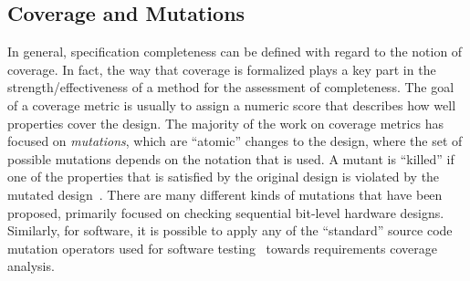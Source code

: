 \subsection{Coverage and Mutations}
\label{subsec:nondet}
In general, specification completeness can be defined with
regard to the notion of coverage. In fact, the way that coverage
is formalized plays a key part in the strength/effectiveness of
a method for the assessment of completeness. The goal of a coverage metric is usually to assign a numeric score that describes how well properties cover the design. The majority of the work on coverage metrics has focused on {\em mutations}, which are ``atomic'' changes to the design, where the set of possible mutations depends on the notation that is used.  A mutant is ``killed'' if one of the properties that is satisfied by the original design is violated by the mutated design~\cite{chockler_coverage_2003,chockler2001practical,chockler2010coverage,Kupferman:2006:SCF,kupferman_theory_2008}.  There are many different kinds of mutations that have been proposed, primarily focused on checking sequential bit-level hardware designs.  
Similarly, for software, it is possible to apply any of the ``standard'' source code mutation operators used for software testing~\cite{Andrews06:mutation} towards requirements coverage analysis.

